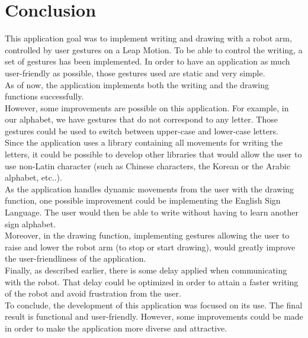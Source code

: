 \section{Conclusion}
This application goal was to implement writing and drawing with a robot arm, controlled by user gestures on a Leap Motion. To be able to control the writing, a set of gestures has been implemented. In order to have an application as much user-friendly as possible, those gestures used are static and very simple.\\
As of now, the application implements both the writing and the drawing functions successfully.\\

However, some improvements are possible on this application. For example, in our alphabet, we have gestures that do not correspond to any letter. Those gestures could be used to switch between upper-case and lower-case letters.\\
Since the application uses a library containing all movements for writing the letters, it could be possible to develop other libraries that would allow the user to use non-Latin character (such as Chinese characters, the Korean or the Arabic alphabet, etc..).\\

As the application handles dynamic movements from the user with the drawing function, one possible improvement could be implementing the English Sign Language. The user would then be able to write without having to learn another sign alphabet.\\
Moreover, in the drawing function, implementing gestures allowing the user to raise and lower the robot arm (to stop or start drawing), would greatly improve the user-friendliness of the application.\\

Finally, as described earlier, there is some delay applied when communicating with the robot. That delay could be optimized in order to attain a faster writing of the robot and avoid frustration from the user.\\

To conclude, the development of this application was focused on its use. The final result is functional and user-friendly. However, some improvements could be made in order to make the application more diverse and attractive.
